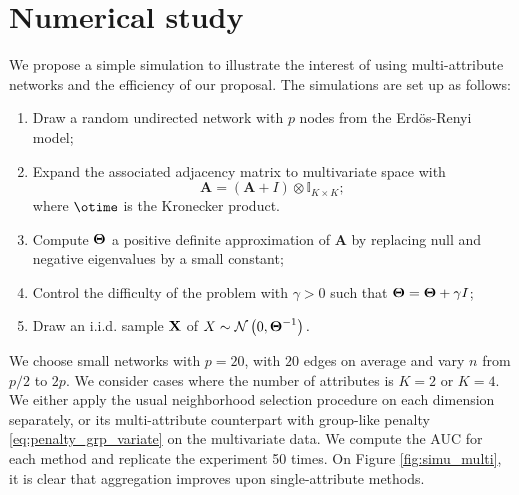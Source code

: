 \section{Numerical  study}

We propose a simple simulation to illustrate the interest of using
multi-attribute networks and the efficiency of our proposal.  The
simulations are set up as follows:
\begin{enumerate}
\item  Draw  a random  undirected  network  with  $p$ nodes  from  the
  Erdös-Renyi model;
\item  Expand the  associated adjacency  matrix to  multivariate space
  with
  $$\mathbf{A}=(\mathbf{A} + I) \otimes \mathbb{I}_{K\times K};$$
  where $\otime$ is the Kronecker product.
\item Compute $\boldsymbol\Theta$ a positive definite approximation of
  $\mathbf{A}$ by replacing null and negative eigenvalues by a small constant;
\item Control the difficulty of  the problem with $\gamma>0$ such that
  $\boldsymbol\Theta= \boldsymbol\Theta+ \gamma I$;
\item  Draw  an i.i.d.   sample  $\mathbf{X}$  of $X  \sim  \mathcal{N} \left( 0,\boldsymbol\Theta^{-1} \right) .$
\end{enumerate}
We choose small  networks with $p=20$, with $20$ edges  on average and
vary $n$  from $p/2$ to  $2p$. We consider  cases where the  number of
attributes is $K=2$ or $K=4$.   We either apply the usual neighborhood
selection   procedure   on   each   dimension   separately,   or   its
multi-attribute      counterpart      with     group-like      penalty
\eqref{eq:penalty_grp_variate} on  the multivariate data.   We compute
the AUC  for each  method and  replicate the  experiment 50  times. On
Figure  \ref{fig:simu_multi}, it  is clear  that aggregation  improves
upon single-attribute methods.
